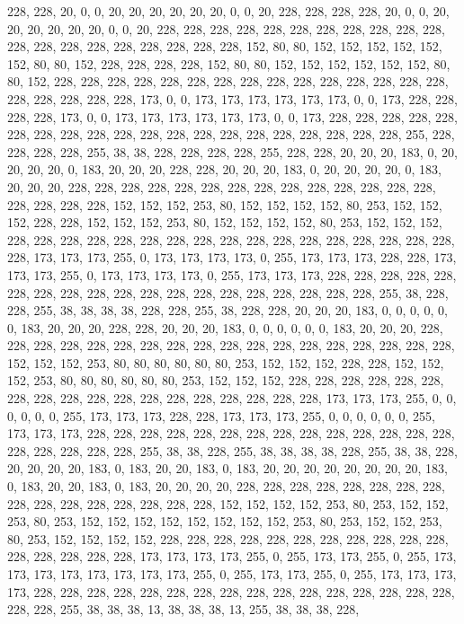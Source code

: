 {	228, 228, 20,  0,   0,   20,  20,  20,  20,  20,  20,  0,   0,   20,  228, 228, 228, 228, 20,  0,   0,   20,  20,  20,  20,  20,  20,  0,   0,   20,  228, 228, 228, 228, 228, 228, 228, 228, 228, 228, 228, 228, 228, 228, 228, 228, 228, 228, 228, 228, 152, 80,  80,  152, 152, 152, 152, 152, 152, 80,  80,  152, 228, 228, 228, 228, 152, 80,  80,  152, 152, 152, 152, 152, 152, 80,  80,  152, 228, 228, 228, 228, 228, 228, 228, 228, 228, 228, 228, 228, 228, 228, 228, 228, 228, 228, 228, 228, 173, 0,   0,   173, 173, 173, 173, 173, 173, 0,   0,   173, 228, 228, 228, 228, 173, 0,   0,   173, 173, 173, 173, 173, 173, 0,   0,   173, 228, 228, 228, 228, 228, 228, 228, 228, 228, 228, 228, 228, 228, 228, 228, 228, 228, 228, 228, 228, 255, 228, 228, 228, 228, 255, 38,  38,  228, 228, 228, 228, 255, 228, 
	228, 20,  20,  20,  183, 0,   20,  20,  20,  20,  0,   183, 20,  20,  20,  228, 228, 20,  20,  20,  183, 0,   20,  20,  20,  20,  0,   183, 20,  20,  20,  228, 228, 228, 228, 228, 228, 228, 228, 228, 228, 228, 228, 228, 228, 228, 228, 228, 228, 152, 152, 152, 253, 80,  152, 152, 152, 152, 80,  253, 152, 152, 152, 228, 228, 152, 152, 152, 253, 80,  152, 152, 152, 152, 80,  253, 152, 152, 152, 228, 228, 228, 228, 228, 228, 228, 228, 228, 228, 228, 228, 228, 228, 228, 228, 228, 228, 173, 173, 173, 255, 0,   173, 173, 173, 173, 0,   255, 173, 173, 173, 228, 228, 173, 173, 173, 255, 0,   173, 173, 173, 173, 0,   255, 173, 173, 173, 228, 228, 228, 228, 228, 228, 228, 228, 228, 228, 228, 228, 228, 228, 228, 228, 228, 228, 228, 255, 38,  228, 228, 255, 38,  38,  38,  38,  228, 228, 255, 38,  228, 
	228, 20,  20,  20,  183, 0,   0,   0,   0,   0,   0,   183, 20,  20,  20,  228, 228, 20,  20,  20,  183, 0,   0,   0,   0,   0,   0,   183, 20,  20,  20,  228, 228, 228, 228, 228, 228, 228, 228, 228, 228, 228, 228, 228, 228, 228, 228, 228, 228, 152, 152, 152, 253, 80,  80,  80,  80,  80,  80,  253, 152, 152, 152, 228, 228, 152, 152, 152, 253, 80,  80,  80,  80,  80,  80,  253, 152, 152, 152, 228, 228, 228, 228, 228, 228, 228, 228, 228, 228, 228, 228, 228, 228, 228, 228, 228, 228, 173, 173, 173, 255, 0,   0,   0,   0,   0,   0,   255, 173, 173, 173, 228, 228, 173, 173, 173, 255, 0,   0,   0,   0,   0,   0,   255, 173, 173, 173, 228, 228, 228, 228, 228, 228, 228, 228, 228, 228, 228, 228, 228, 228, 228, 228, 228, 228, 228, 255, 38,  38,  228, 255, 38,  38,  38,  38,  228, 255, 38,  38,  228, 
	20,  20,  20,  20,  183, 0,   183, 20,  20,  183, 0,   183, 20,  20,  20,  20,  20,  20,  20,  20,  183, 0,   183, 20,  20,  183, 0,   183, 20,  20,  20,  20,  228, 228, 228, 228, 228, 228, 228, 228, 228, 228, 228, 228, 228, 228, 228, 228, 152, 152, 152, 152, 253, 80,  253, 152, 152, 253, 80,  253, 152, 152, 152, 152, 152, 152, 152, 152, 253, 80,  253, 152, 152, 253, 80,  253, 152, 152, 152, 152, 228, 228, 228, 228, 228, 228, 228, 228, 228, 228, 228, 228, 228, 228, 228, 228, 173, 173, 173, 173, 255, 0,   255, 173, 173, 255, 0,   255, 173, 173, 173, 173, 173, 173, 173, 173, 255, 0,   255, 173, 173, 255, 0,   255, 173, 173, 173, 173, 228, 228, 228, 228, 228, 228, 228, 228, 228, 228, 228, 228, 228, 228, 228, 228, 228, 228, 255, 38,  38,  38,  13,  38,  38,  38,  13,  255, 38,  38,  38,  228, 
}
